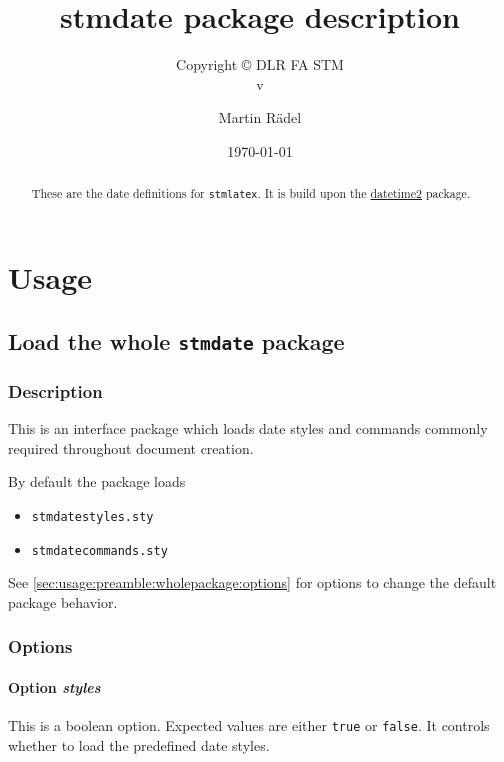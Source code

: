 \documentclass{scrartcl}
\author{Martin R\"{a}del}
\title{stmdate package description}
\subtitle{Copyright \copyright{} \the\year{} DLR FA STM\\v\formatdate[versiondatestyle]{\DTMToday}}
\date{\today}
\begin{document}
\maketitle

\begin{abstract}
These are the date definitions for \texttt{stmlatex}. It is build upon the \href{https://ctan.org/pkg/datetime2}{datetime2} package.
\end{abstract}

\tableofcontents

\section{Usage}%

\subsection{Load the whole \protect\texttt{stmdate} package}

\subsubsection{Description}
\label{sec:usage:preamble:wholepackage:description}

This is an interface package which loads date styles and commands commonly required throughout document creation.

By default the package loads

\begin{itemize}[noitemsep]
  \item \verb+stmdatestyles.sty+
  \item \verb+stmdatecommands.sty+
\end{itemize}

See \autoref{sec:usage:preamble:wholepackage:options} for options to change the default package behavior.

\subsubsection{Options}
\label{sec:usage:preamble:wholepackage:options}

\paragraph{Option \protect\textit{styles}} 
\label{sec:usage:preamble:wholepackage:options:styles}

This is a boolean option. Expected values are either \texttt{true} or \texttt{false}. It controls whether to load the predefined date styles.
\end{document}
